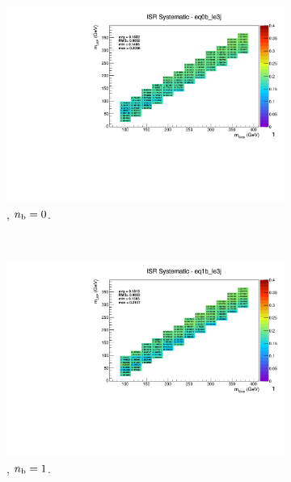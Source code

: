 \begin{figure}[ht!]
\begin{subfigure}[b]{0.32\textwidth}
    \includegraphics[width=\textwidth, page=1]{Figs/sms/t2degen/v19_3/systs/T2_4body_ISR_eq0b_le3j.pdf}
    \caption{\njlow, $n_{\text{b}} = 0$.}
  \end{subfigure}\\
  \begin{subfigure}[b]{0.32\textwidth}
    \includegraphics[width=\textwidth, page=14]{Figs/sms/t2degen/v19_3/systs/T2_4body_ISR_eq1b_le3j.pdf}
    \caption{\njlow, $n_{\text{b}} = 1$.}
  \end{subfigure}
  \begin{subfigure}[b]{0.32\textwidth}

\end{subfigure}
\end{figure}

